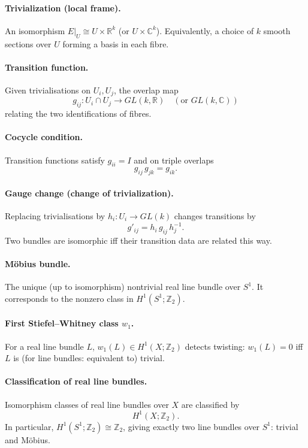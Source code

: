 \documentclass[12pt,a4paper]{article}
\theoremstyle{plain}
\theoremstyle{definition}      %
\begin{document}
\paragraph{\textbf{Trivialization (local frame).}}
An isomorphism $E|_U \cong U\times \mathbb{R}^k$ (or $U\times\mathbb{C}^k$).
Equivalently, a choice of $k$ smooth sections over $U$ forming a basis in each fibre.

\paragraph{\textbf{Transition function.}}
Given trivialisations on $U_i,U_j$, the overlap map
\[
g_{ij}:U_i\cap U_j \to GL(k,\mathbb{R}) \quad (\text{or } GL(k,\mathbb{C}))
\]
relating the two identifications of fibres.

\paragraph{\textbf{Cocycle condition.}}
Transition functions satisfy $g_{ii}=I$ and on triple overlaps
\[
g_{ij}\,g_{jk} = g_{ik}.
\]

\paragraph{\textbf{Gauge change (change of trivialization).}}
Replacing trivialisations by $h_i:U_i\to GL(k)$ changes transitions by
\[
g'_{ij} = h_i\,g_{ij}\,h_j^{-1}.
\]
Two bundles are isomorphic iff their transition data are related this way.

\paragraph{\textbf{Möbius bundle.}}
The unique (up to isomorphism) nontrivial real line bundle over $S^1$.
It corresponds to the nonzero class in $H^1(S^1;\mathbb{Z}_2)$.

\paragraph{\textbf{First Stiefel--Whitney class $w_1$.}}
For a real line bundle $L$, $w_1(L)\in H^1(X;\mathbb{Z}_2)$ detects twisting:
$w_1(L)=0$ iff $L$ is (for line bundles: equivalent to) trivial.

\paragraph{\textbf{Classification of real line bundles.}}
Isomorphism classes of real line bundles over $X$ are classified by
\[
H^1(X;\mathbb{Z}_2).
\]
In particular, $H^1(S^1;\mathbb{Z}_2)\cong \mathbb{Z}_2$, giving exactly two line bundles over $S^1$:
trivial and Möbius.
\end{document}
